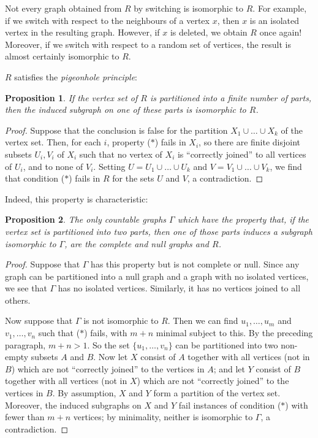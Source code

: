 \documentclass{book}
\newtheorem{proposition}{Proposition}
\begin{document}
Not every graph obtained from $R$ by switching is isomorphic to $R$.
For example, if we switch with respect to the neighbours of a vertex
$x$, then $x$ is an isolated vertex in the resulting graph. However,
if $x$ is deleted, we obtain $R$ once again! Moreover, if we switch
with respect to a random set of vertices, the result is almost
certainly isomorphic to $R$.

$R$ satisfies the \emph{pigeonhole principle}:
\begin{proposition}\label{ch32:prop3.3} 
If the vertex set of $R$ is partitioned into a
finite number of parts, then the induced subgraph on one of these
parts is isomorphic to $R$.
\end{proposition}
\begin{proof}
Suppose that the conclusion is false for the
partition $X_1 \cup \ldots \cup X_k$ of the vertex set. Then, for
each $i$, property ($\ast$) fails in $X_i$, so there are finite
disjoint subsets $U_i, V_i$ of $X_i$ such that no vertex of $X_i$
is ``correctly joined'' to all vertices of $U_i$, and to none of
$V_i$. Setting $U = U_1 \cup \ldots \cup U_k$ and $V = V_1 \cup
\ldots \cup V_k$, we find that condition ($\ast$) fails in $R$ for
the sets $U$ and $V$, a contradiction.
\end{proof}

Indeed, this property is characteristic:
\begin{proposition}\label{ch32:prop3.4} 
The only countable graphs $\Gamma$ which have
the property that, if the vertex set is partitioned into two parts,
then one of those parts induces a subgraph isomorphic to $\Gamma$,
are the complete and null graphs and $R$.
\end{proposition}
\begin{proof}
Suppose that $\Gamma$ has this property but is not
complete or null. Since any graph can be partitioned into a null
graph and a graph with no isolated vertices, we see that $\Gamma$
has no isolated vertices. Similarly, it has no vertices joined to
all others.

Now suppose that $\Gamma$ is not isomorphic to $R$. Then we can find
$u_1,\ldots,u_m$ and $v_1,\ldots,v_n$ such that ($\ast$) fails, with
$m +n$ minimal subject to this. By the preceding paragraph, $m + n >
1$. So the set $\{u_1,\ldots, v_n\}$ can be partitioned into two
non-empty subsets $A$ and $B$. Now let $X$ consist of $A$ together
with all vertices (not in $B$) which are not ``correctly joined'' to
the vertices in $A$; and let $Y$ consist of $B$ together with all
vertices (not in $X$) which are not ``correctly joined'' to the
vertices in $B$. By assumption, $X$ and $Y$ form a partition of the
vertex set. Moreover, the induced subgraphs on $X$ and $Y$ fail
instances of condition ($\ast$) with fewer than $m +n$ vertices; by
minimality, neither is isomorphic to $\Gamma$, a contradiction.
\end{proof}
\end{document}
